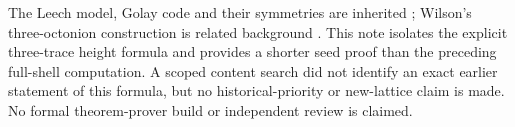 The Leech model, Golay code and their symmetries are inherited \cite{brouwer,chapman}; Wilson's three-octonion construction is related background \cite{wilson}. This note isolates the explicit three-trace height formula and provides a shorter seed proof than the preceding full-shell computation. A scoped content search did not identify an exact earlier statement of this formula, but no historical-priority or new-lattice claim is made. No formal theorem-prover build or independent review is claimed.
